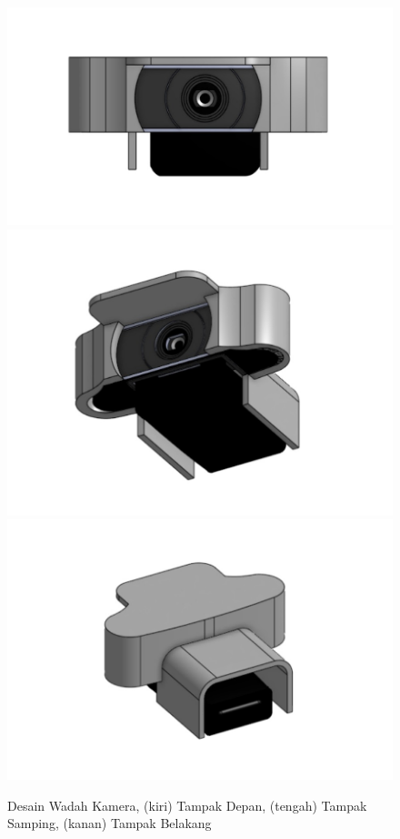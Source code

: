 \begin{figure}
  \centering

  \includegraphics[scale=0.16]{gambar/bab3-tampak-depan-case-camera.jpeg}
  \includegraphics[scale=0.16]{gambar/bab3-tampak-samping-case-camera.jpeg}
  \includegraphics[scale=0.16]{gambar/bab3-tampak-belakang-case-camera.jpeg}

  \caption{\centering Desain Wadah Kamera, (kiri) Tampak Depan, (tengah) Tampak Samping, (kanan) Tampak Belakang}
  \label{fig:designcontainercamera}
\end{figure}

